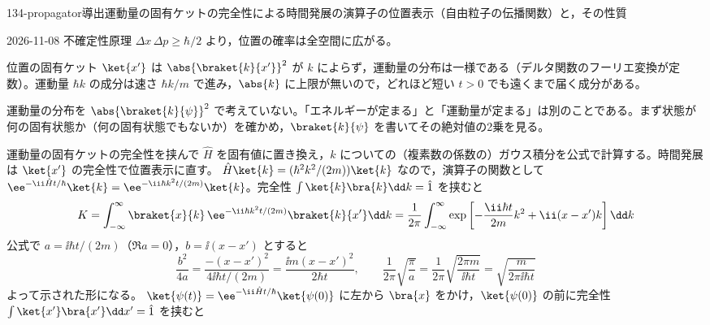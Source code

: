 \documentclass[uplatex,dvipdfmx,a4paper,11pt]{jsarticle}
\begin{document}
\begin{mondai}{134-propagator}{導出}{運動量の固有ケットの完全性による時間発展の演算子の位置表示（自由粒子の伝播関数）と，その性質}
\begin{kotaeutsushi}{2026-11-08}
不確定性原理 $\Delta x\,\Delta p\ge\hbar/2$ より，位置の確率は全空間に広がる。
\end{kotaeutsushi}
\begin{kizuki}
\item 位置の固有ケット $\ket{x'}$ は $\abs{\braket{k}{x'}}^{2}$ が $k$ によらず，運動量の分布は一様である（デルタ関数のフーリエ変換が定数）。運動量 $\hbar k$ の成分は速さ $\hbar k/m$ で進み，$\abs{k}$ に上限が無いので，どれほど短い $t>0$ でも遠くまで届く成分がある。
\item {} 運動量の分布を $\abs{\braket{k}{\psi}}^{2}$ で考えていない。「エネルギーが定まる」と「運動量が定まる」は別のことである。まず状態が何の固有状態か（何の固有状態でもないか）を確かめ，$\braket{k}{\psi}$ を書いてその絶対値の2乗を見る。
\end{kizuki}
\begin{tadashii}
\houshin 運動量の固有ケットの完全性を挟んで $\hat{H}$ を固有値に置き換え，$k$ についての（複素数の係数の）ガウス積分を公式で計算する。時間発展は $\ket{x'}$ の完全性で位置表示に直す。
\keisan
{} $\hat{H}\ket{k}=(\hbar^{2}k^{2}/(2m))\ket{k}$ なので，演算子の関数として $\ee^{-\ii\hat{H}t/\hbar}\ket{k}=\ee^{-\ii\hbar k^{2}t/(2m)}\ket{k}$。完全性 $\int\ket{k}\bra{k}\dd k=\hat{1}$ を挟むと
\[ K=\int_{-\infty}^{\infty}\braket{x}{k}\,\ee^{-\ii\hbar k^{2}t/(2m)}\braket{k}{x'}\dd k=\frac{1}{2\pi}\int_{-\infty}^{\infty}\exp\left[-\frac{\ii\hbar t}{2m}k^{2}+\ii(x-x')k\right]\dd k \]
公式で $a=\ii\hbar t/(2m)$（$\Re a=0$），$b=\ii(x-x')$ とすると
\[ \frac{b^{2}}{4a}=\frac{-(x-x')^{2}}{4\ii\hbar t/(2m)}=\frac{\ii m(x-x')^{2}}{2\hbar t},\qquad \frac{1}{2\pi}\sqrt{\frac{\pi}{a}}=\frac{1}{2\pi}\sqrt{\frac{2\pi m}{\ii\hbar t}}=\sqrt{\frac{m}{2\pi\ii\hbar t}} \]
よって示された形になる。
 $\ket{\psi(t)}=\ee^{-\ii\hat{H}t/\hbar}\ket{\psi(0)}$ に左から $\bra{x}$ をかけ，$\ket{\psi(0)}$ の前に完全性 $\int\ket{x'}\bra{x'}\dd x'=\hat{1}$ を挟むと

\end{tadashii}
\end{mondai}
\end{document}
